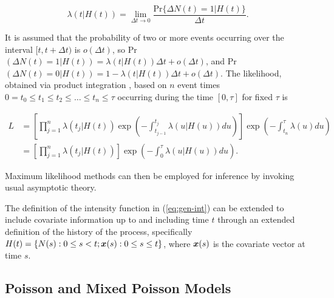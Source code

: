 \documentclass[12pt]{article}
\def \bx{\mbox{\boldmath $x$ \unboldmath}\!\!}
\begin{document}
\begin{equation}\label{eq:gen-int}
\lambda(t|H(t))=\lim_{\Delta t \to 0} \frac{\mbox{Pr} \{\Delta N(t)=1 |H(t) \}}{\Delta t}. 
\end{equation}

It is assumed that the probability of two or more events occurring over the interval $[t,t+\Delta t)$ is $o (\Delta t)$, so Pr$(\Delta N(t)=1 |H(t))=\lambda(t|H(t)) \Delta t + o(\Delta t)$, and Pr$(\Delta N(t)=0 |H(t))=1- \lambda(t|H(t)) \Delta t + o(\Delta t)$. The likelihood, obtained via product integration \citep{kalbfleisch2011statistical}, based on $n$ event times $0=t_0 \leq t_1 \leq t_2 \leq\ldots \leq t_n \leq \tau$ occurring during the time $[0,\tau]$ for fixed $\tau$ is

\begin{align}
L &= \left[ \prod^{n}_{j=1} \lambda (t_j|H(t)) \exp \left( -\int^{t_j}_{t_{j-1}} \lambda(u|H(u)) du \right) \right] \exp \left( -\int^{\tau}_{t_n} \lambda (u)du  \right) \\
 &=\left[ \prod^{n}_{j=1} \lambda(t_j|H(t)) \right] \exp \left( -\int^{\tau}_{0} \lambda (u|H(u))du  \right).
\end{align} 

Maximum likelihood methods can then be employed for inference by invoking usual asymptotic theory.


The definition of the intensity function in (\ref{eq:gen-int}) can be extended to include covariate information up to and including time $t$ through an extended definition of the history of the process, specifically $H(t)=\{N(s): 0\leq s<t; \bx(s): 0\leq s \leq t \}$, where $\bx(s)$ is the covariate vector at time $s$. 

\subsection{Poisson and Mixed Poisson Models}
\end{document}
